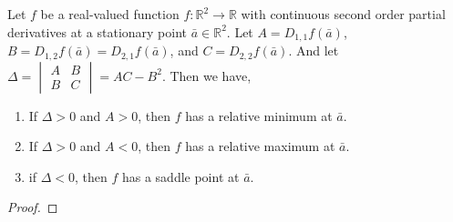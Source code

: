 \begin{theorem}
Let $f$ be a real-valued function $f : \mathbb{R}^2 \to \mathbb{R}$ with continuous second order partial derivatives at a stationary point $\bar{a} \in \mathbb{R}^2$.
Let $A = D_{1,1}f(\bar{a})$, $B = D_{1,2}f(\bar{a}) = D_{2,1}f(\bar{a})$, and $C = D_{2,2}f(\bar{a})$.
And let $\Delta = \begin{vmatrix}A & B \\ B & C \end{vmatrix} = AC - B^2$.
Then we have,
\begin{enumerate}
	\item If $\Delta > 0$ and $A > 0$, then $f$ has a relative minimum at $\bar{a}$.
	\item If $\Delta > 0$ and $A < 0$, then $f$ has a relative maximum at $\bar{a}$.
	\item if $\Delta < 0$, then $f$ has a saddle point at $\bar{a}$.
\end{enumerate}
\end{theorem}
\begin{proof}
\end{proof}


